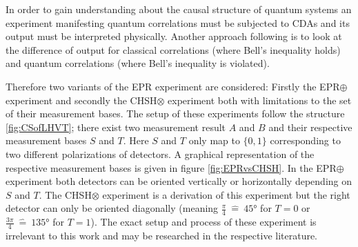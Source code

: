 In order to gain understanding about the causal structure of quantum systems an experiment manifesting quantum correlations must be subjected to \acp{CDA} and its output must be interpreted physically.
Another approach following \cite{Wood.2015} is to look at the difference of output for classical correlations (where Bell's inequality holds) and quantum correlations (where Bell's inequality is violated).

Therefore two variants of the \ac{EPR} experiment are considered: Firstly the \ac{EPR}$\oplus$ experiment \cite{Einstein.1935} and secondly the CHSH$\otimes$ experiment \cite{Clauser.1969} both with limitations to the set of their measurement bases.
The setup of these experiments follow the structure \ref{fig:CSofLHVT}; there exist two measurement result $A$ and $B$ and their respective measurement bases $S$ and $T$.
Here $S$ and $T$ only map to $\{0,1\}$ corresponding to two different polarizations of detectors.
A graphical representation of the respective measurement bases is given in figure \ref{fig:EPRvsCHSH}.
In the \ac{EPR}$\oplus$ experiment both detectors can be oriented vertically or horizontally depending on $S$ and $T$.
The \ac{CHSH}$\otimes$ experiment is a derivation of this experiment but the right detector can only be oriented diagonally (meaning $\frac{\pi}{4}\ \widehat{=}\ \ang{45}$ for $T=0$ or $\frac{3\pi}{4}\ \widehat{=}\ \ang{135}$ for $T=1$).
The exact setup and process of these experiment is irrelevant to this work and may be researched in the respective literature.

